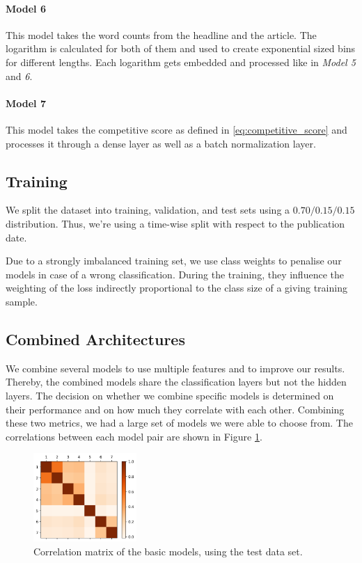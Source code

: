 \paragraph{Model 6} 
This model takes the word counts from the headline and the article.
The logarithm is calculated for both of them and used to create exponential sized bins for different lengths.
Each logarithm gets embedded and processed like in \textit{Model 5} and \textit{6}.

\paragraph{Model 7} 
This model takes the competitive score as defined in \autoref{eq:competitive_score} and processes it through a dense layer as well as a batch normalization layer.

\subsection{Training}
We split the dataset into training, validation, and test sets using a $0.70/0.15/0.15$ distribution.
Thus, we're using a time-wise split with respect to the publication date.

Due to a strongly imbalanced training set, we use class weights to penalise our models in case of a wrong classification.
During the training, they influence the weighting of the loss indirectly proportional to the class size of a giving training sample.

\subsection{Combined Architectures}
We combine several models to use multiple features and to improve our results.
Thereby, the combined models share the classification layers but not the hidden layers.
The decision on whether we combine specific models is determined on their performance and on how much they correlate with each other.
Combining these two metrics, we had a large set of models we were able to choose from.
The correlations between each model pair are shown in Figure \ref{fig:correlation_matrix}. 

\begin{figure}
	\includegraphics[width=0.35\textwidth]{fig/correlations.png}
	\caption{\textmd{Correlation matrix of the basic models, using the test data set.}}
	\label{fig:correlation_matrix}
\end{figure}